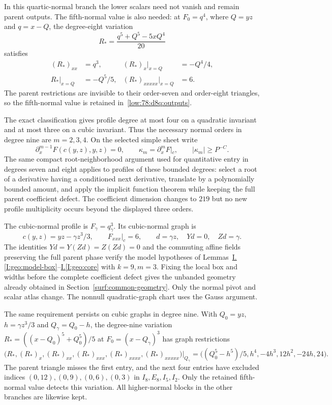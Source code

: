 \documentclass[11pt]{amsart}
\theoremstyle{definition}
\theoremstyle{remark}
\numberwithin{equation}{section}
\newcommand{\partIref}[1]{\hyperref[I:#1]{I.\ref*{I:#1}}}
\begin{document}
In this quartic-normal branch the lower scalars need not vanish and remain parent outputs. The fifth-normal value is also needed: at $F_0=q^4$, where $Q=yz$ and $q=x-Q$, the degree-eight variation
\begin{equation}\label{low:78:d8q:hidden}
R_*=\frac{q^5+Q^5-5xQ^4}{20}
\end{equation}
satisfies
\[
\begin{aligned}
(R_*)_{xx}&=q^3,& (R_*)_x|_{x=Q}&=-Q^4/4,\\
R_*|_{x=Q}&=-Q^5/5,& (R_*)_{xxxxx}|_{x=Q}&=6.
\end{aligned}
\]
The parent restrictions are invisible to their order-seven and order-eight triangles, so the fifth-normal value is retained in~\eqref{low:78:d8q:outputs}.

The exact classification gives profile degree at most four on a quadratic invariant and at most three on a cubic invariant. Thus the necessary normal orders in degree nine are $m=2,3,4$. On the selected simple sheet write
\[
 \partial_x^{m-1}F(c(y,z),y,z)=0,\qquad
 \kappa_m=\partial_x^mF|_c,\qquad |\kappa_m|\ge P^{-C}.
\]
The same compact root-neighborhood argument used for quantitative entry in degrees seven and eight applies to profiles of these bounded degrees: select a root of a derivative having a conditioned next derivative, translate by a polynomially bounded amount, and apply the implicit function theorem while keeping the full parent coefficient defect. The coefficient dimension changes to $219$ but no new profile multiplicity occurs beyond the displayed three orders.

The cubic-normal profile is $F_\gamma=q_\gamma^3$. Its cubic-normal graph is
\[
c(y,z)=yz-\gamma z^3/3,\qquad F_{xxx}|_c=6,
 \qquad d=\gamma z,\quad Yd=0,\quad Zd=\gamma.
\]
The identities $Yd=Y(Zd)=Z(Zd)=0$ and the commuting affine fields preserving the full parent phase verify the model hypotheses of Lemmas~\partIref{geo:model-box}--\partIref{geo:core} with $k=9,m=3$. Fixing the local box and widths before the complete coefficient defect gives the unbanded geometry already obtained in Section~\ref{surf:common-geometry}. Only the normal pivot and scalar atlas change. The nonnull quadratic-graph chart uses the Gauss argument.

The same requirement persists on cubic graphs in degree nine. With $Q_0=yz$, $h=\gamma z^3/3$ and $Q_\gamma=Q_0-h$, the degree-nine variation $R_*=((x-Q_0)^5+Q_0^5)/5$ at $F_0=(x-Q_\gamma)^3$ has graph restrictions
\[
\bigl(R_*,(R_*)_x,(R_*)_{xx},(R_*)_{xxx},(R_*)_{xxxx},(R_*)_{xxxxx}\bigr)|_{Q_\gamma}
=\bigl((Q_0^5-h^5)/5,h^4,-4h^3,12h^2,-24h,24\bigr).
\]
The parent triangle misses the first entry, and the next four entries have excluded indices $(0,12),(0,9),(0,6),(0,3)$ in $I_8,E_8,I_5,I_2$. Only the retained fifth-normal value detects this variation. All higher-normal blocks in the other branches are likewise kept.
\end{document}
